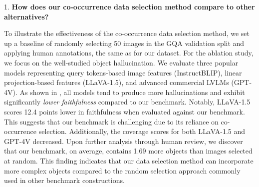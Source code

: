 \begin{table}[t]
\small
\centering
{}
\vspace{-2mm}
\caption{Model performance comparison on our data selection method against random selection. Faithfulness and coverage scores are in percentage (\%).} 
\vspace{-6mm}
\label{tab:co-ocurrence ablate}
\end{table}

1. \textbf{How does our co-occurrence data selection method compare to other alternatives?} 

To illustrate the effectiveness of the co-occurrence data selection method, we set up a baseline of randomly selecting 50 images in the GQA validation split and applying human annotations, the same as for our dataset. For the ablation study, we focus on the well-studied object hallucination. We evaluate three popular models representing query tokens-based image features (InstructBLIP), linear projection-based features (LLaVA-1.5), and advanced commercial LVLMs (GPT-4V). As shown in , all models tend to produce more hallucinations and exhibit significantly \textit{lower faithfulness} compared to our benchmark. Notably, LLaVA-1.5 scores 12.4 points lower in faithfulness when evaluated against our benchmark. This suggests that our benchmark is challenging due to its reliance on co-occurrence selection. Additionally, the coverage scores for both LLaVA-1.5 and GPT-4V decreased. Upon further analysis through human review, we discover that our benchmark, on average, contains 1.69 more objects than images selected at random. This finding indicates that our data selection method can incorporate more complex objects compared to the random selection approach commonly used in other benchmark constructions.   

